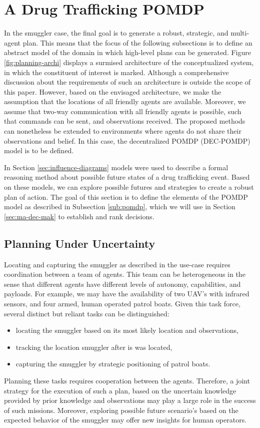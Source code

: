 \documentclass[conference]{IEEEtran}
\begin{document}
\section{A Drug Trafficking POMDP}
\label{sec:scenario-based-dm}

In the smuggler case, the final goal is to generate a robust, strategic, and multi-agent plan. This means that the focus of the following subsections is to define an abstract model of the domain in which high-level plans can be generated. Figure \ref{fig:planning-archi} displays a surmised architecture of the conceptualized system, in which the constituent of interest is marked. Although a comprehensive discussion about the requirements of such an architecture is outside the scope of this paper. However, based on the envisaged architecture, we make the assumption that the locations of all friendly agents are available. Moreover, we assume that two-way communication with all friendly agents is possible, such that commands can be sent, and observations received. The proposed methods can nonetheless be extended to environments where agents do not share their observations and belief. In this case, the decentralized POMDP (DEC-POMDP) \cite{dec-pomdp,oliehoek2008optimal} model is to be defined.

In Section \ref{sec:influence-diagrams} models were used to describe a formal reasoning method about possible future states of a drug trafficking event. Based on these models, we can explore possible futures and strategies to create a robust plan of action. The goal of this section is to define the elements of the POMDP model as described in Subsection \ref{sub:pomdp}, which we will use in Section \ref{sec:ma-dec-mak} to establish and rank decisions.

\subsection{Planning Under Uncertainty}
\label{sub:plan-uncert}

Locating and capturing the smuggler as described in the use-case requires coordination between a team of agents. This team can be heterogeneous in the sense that different agents have different levels of autonomy, capabilities, and payloads. For example, we may have the availability of two UAV's with infrared sensors, and four armed, human operated patrol boats. Given this task force, several distinct but reliant tasks can be distinguished:
\begin{itemize}
\item locating the smuggler based on its most likely location and observations,
\item tracking the location smuggler after is was located,
\item capturing the smuggler by strategic positioning of patrol boats.
\end{itemize}
Planning these tasks requires cooperation between the agents. Therefore, a joint strategy for the execution of such a plan, based on the uncertain knowledge provided by prior knowledge and observations may play a large role in the success of such missions. Moreover, exploring possible future scenario's based on the expected behavior of the smuggler may offer new insights for human operators.
\end{document}

